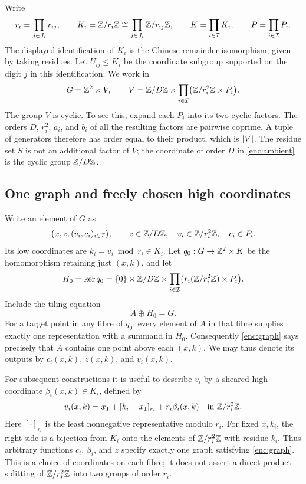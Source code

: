 Write
\[
 r_i=\prod_{j\in J_i}r_{ij},\qquad
 K_i=\mathbb Z/r_i\mathbb Z\cong\prod_{j\in J_i}\mathbb Z/r_{ij}\mathbb Z,\qquad
 K=\prod_{i\in\mathcal I}K_i,\qquad
 P=\prod_{i\in\mathcal I}P_i.
\]
The displayed identification of $K_i$ is the Chinese remainder
isomorphism, given by taking residues.  Let $U_{ij}\leq K_i$ be the
coordinate subgroup supported on the digit $j$ in this identification.
We work in
\begin{equation}
 G=\mathbb Z^2\times V,\qquad
 V=\mathbb Z/D\mathbb Z\times\prod_{i\in\mathcal I}
       \bigl(\mathbb Z/r_i^2\mathbb Z\times P_i\bigr).
 \label{enc:ambient}
\end{equation}
The group $V$ is cyclic.  To see this, expand each $P_i$ into its two
cyclic factors.  The orders $D$, $r_i^2$, $a_i$, and $b_i$ of all the
resulting factors are pairwise coprime.  A tuple of generators therefore
has order equal to their product, which is $\lvert V\rvert$.
The residue set $S$ is not an additional factor of $V$; the coordinate
of order $D$ in \eqref{enc:ambient} is the cyclic group $\mathbb Z/D\mathbb Z$.

\subsection{One graph and freely chosen high coordinates}

Write an element of $G$ as
\[
 \bigl(x,z,(v_i,c_i)_{i\in\mathcal I}\bigr),\qquad
 z\in\mathbb Z/D\mathbb Z,\quad v_i\in\mathbb Z/r_i^2\mathbb Z,\quad c_i\in P_i.
\]
Its low coordinates are $k_i=v_i\bmod r_i\in K_i$.  Let
$q_0:G\to\mathbb Z^2\times K$ be the homomorphism retaining just $(x,k)$,
and let
\[
 H_0=\ker q_0
   =\{0\}\times\mathbb Z/D\mathbb Z\times
       \prod_{i\in\mathcal I}
       \bigl(r_i(\mathbb Z/r_i^2\mathbb Z)\times P_i\bigr).
\]
Include the tiling equation
\begin{equation}
 A\oplus H_0=G.
 \label{enc:graph}
\end{equation}
For a target point in any fibre of $q_0$, every element of $A$ in that
fibre supplies exactly one representation with a summand in $H_0$.
Consequently \eqref{enc:graph} says precisely that $A$ contains one
point above each $(x,k)$.  We may thus denote its outputs by
$c_i(x,k)$, $z(x,k)$, and $v_i(x,k)$.

For subsequent constructions it is useful to describe $v_i$ by a
sheared high coordinate $\beta_i(x,k)\in K_i$, defined by
\begin{equation}
 v_i(x,k)=x_1+[k_i-x_1]_{r_i}+r_i\beta_i(x,k)
       \quad\text{in }\mathbb Z/r_i^2\mathbb Z.
 \label{enc:shear}
\end{equation}
Here $[\cdot]_{r_i}$ is the least nonnegative representative modulo
$r_i$.  For fixed $x,k_i$, the right side is a bijection from $K_i$
onto the elements of $\mathbb Z/r_i^2\mathbb Z$ with residue $k_i$.
Thus arbitrary functions $c_i$, $\beta_i$, and $z$ specify exactly one
graph satisfying \eqref{enc:graph}.  This is a choice of coordinates
on each fibre; it does not assert a direct-product splitting of
$\mathbb Z/r_i^2\mathbb Z$ into two groups of order $r_i$.


